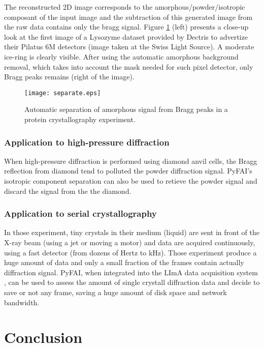 \documentclass[preprint]{iucr}
\begin{document}
The reconstructed 2D image corresponds to the amorphous/powder/isotropic
composant of the input image and the subtraction of this generated image from
the raw data contains only the bragg signal.
Figure \ref{separate} (left)
presents a close-up look at the first image of a Lysozyme dataset provided by Dectris to
advertize their Pilatus 6M detectors (image taken at the Swiss Light Source). A
moderate ice-ring is clearly visible. After using the automatic amorphous
background removal, which takes into account the mask needed for such pixel
detector, only Bragg peaks remains (right of the image).

\begin{figure}
\label{separate}
\begin{center}
\texttt{[image: separate.eps]}
\caption{Automatic separation of amorphous signal from Bragg peaks in a
protein crystallography experiment.}
\end{center}
\end{figure}

\subsubsection{Application to high-pressure diffraction}
When high-pressure diffraction is performed using diamond anvil cells, the Bragg
reflection from diamond tend to polluted the powder diffraction signal. PyFAI's
isotropic component separation can also be used to retieve the powder signal and
discard the signal from the the diamond.

\subsubsection{Application to serial crystallography}
In those experiment, tiny crystals in their medium (liquid) are sent in front of
the X-ray beam (using a jet or moving a motor) and data are acquired
continuously, using a fast detector (from dozens of Hertz to kHz).
Those experiment produce a huge amount of data and only a small fraction of the
frames contain actually diffraction signal.
PyFAI, when integrated into the LImA data acquisition system \cite{lima},
can be used to assess the amount of single crystall diffraction data and decide
to save or not any frame, saving a huge amount of disk space and network
bandwidth.



\section{Conclusion}
\end{document}
